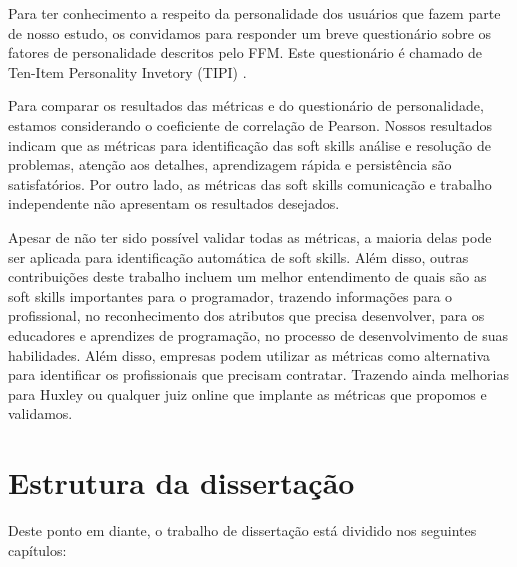 Para ter conhecimento a respeito da personalidade dos usuários que fazem parte de nosso estudo, os convidamos para responder um breve questionário sobre os fatores de personalidade descritos pelo FFM. Este questionário é chamado de Ten-Item Personality Invetory (TIPI) \cite{gosling:03}.

Para comparar os resultados das métricas e do questionário de personalidade, estamos considerando o coeficiente de correlação de Pearson. Nossos resultados indicam que as métricas para identificação das soft skills análise e resolução de problemas, atenção aos detalhes, aprendizagem rápida e persistência são satisfatórios. Por outro lado, as métricas das soft skills comunicação e trabalho independente não apresentam os resultados desejados. 

Apesar de não ter sido possível validar todas as métricas, a maioria delas pode ser aplicada para identificação automática de soft skills. Além disso, outras contribuições deste trabalho incluem um melhor entendimento de quais são as soft skills importantes para o programador, trazendo informações para o profissional, no reconhecimento dos atributos que precisa desenvolver, para os educadores e aprendizes de programação, no processo de desenvolvimento de suas habilidades. Além disso, empresas podem utilizar as métricas como alternativa para identificar os profissionais que precisam contratar. Trazendo ainda melhorias para Huxley ou qualquer juiz online que implante as métricas que propomos e validamos.

\section{Estrutura da dissertação}

Deste ponto em diante, o trabalho de dissertação está dividido nos seguintes capítulos:

